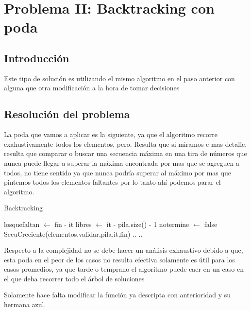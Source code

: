 \section{Problema II: Backtracking con poda}

\subsection{Introducción}
Este tipo de solución es utilizando el mismo algoritmo en el paso anterior con alguna que otra modificación a la hora de tomar decisiones
\subsection{Resolución del problema}
La poda que vamos a aplicar es la siguiente, ya que el algoritmo recorre exahustivamente todos los elementos, pero. Resulta que si miramos e mas
detalle, resulta que comparar o buscar una secuencia máxima en una tira de números que nunca puede llegar a superar la máxima encontrada por mas que
se agreguen a todos, no tiene sentido ya que nunca podría superar al máximo por mas que pintemos todos los elementos faltantes por lo tanto ahí podemos parar el
algoritmo.

\begin{algorithm}[H]
\caption{Backtracking}
\begin{algorithmic}[1]
    \State
    \State {}
    \State losquefaltan $\gets$ fin - it
    \State libres $\gets$ it - pila.size() - 1
    \State {}
    \State notermine $\gets$ false
    \State \Else
    \State {}
    \State SecuCreciente(elementos,validar,pila,it,fin)
    \State ..
    \State ..
    \EndIf
    \EndWhile
    \EndIf
    \EndWhile
\end{algorithmic}
\end{algorithm}

Respecto a la complejidad no se debe hacer un análisis exhaustivo debido a que, esta poda en el peor de los casos no resulta efectiva
solamente es útil para los casos promedios, ya que tarde o temprano el algoritmo puede caer en un caso en el que deba recorrer todo el
árbol de soluciones

Solamente hace falta modificar la función ya descripta con anterioridad y su hermana azul.
\newpage
